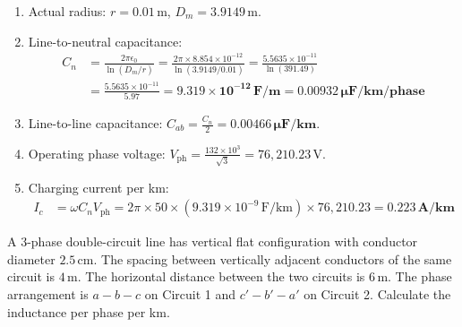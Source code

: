 \documentclass[11pt,a4paper]{article}
\newenvironment{Problem}[1][Numerical Problem]{\begin{tcolorbox}[problembox, title=#1]}{\end{tcolorbox}}
\newenvironment{Solution}[1][Step-by-Step Solution]{\begin{tcolorbox}[solbox, title=#1]}{\end{tcolorbox}}
\begin{document}
\begin{Solution}
\begin{enumerate}
  \item Actual radius: $r = 0.01\,\text{m}$, $D_m = 3.9149\,\text{m}$.
  \item Line-to-neutral capacitance:
    \begin{align*}
      C_n &= \frac{2\pi \epsilon_0}{\ln(D_m / r)} = \frac{2\pi \times 8.854 \times 10^{-12}}{\ln(3.9149 / 0.01)} = \frac{5.5635 \times 10^{-11}}{\ln(391.49)} \\
          &= \frac{5.5635 \times 10^{-11}}{5.97} = \mathbf{9.319 \times 10^{-12}\,\text{F/m}} = \mathbf{0.00932\,\mu\text{F/km/phase}}
    \end{align*}
  \item Line-to-line capacitance: $C_{ab} = \frac{C_n}{2} = \mathbf{0.00466\,\mu\text{F/km}}$.
  \item Operating phase voltage: $V_{\text{ph}} = \frac{132 \times 10^3}{\sqrt{3}} = 76,210.23\,\text{V}$.
  \item Charging current per km:
    \begin{align*}
      I_c &= \omega C_n V_{\text{ph}} = 2\pi \times 50 \times (9.319 \times 10^{-9}\,\text{F/km}) \times 76,210.23 = \mathbf{0.223\,\text{A/km}}
    \end{align*}
\end{enumerate}
\end{Solution}

\begin{Problem}[Problem 3: Inductance of a Three-Phase Double-Circuit Line]
A $3$-phase double-circuit line has vertical flat configuration with conductor diameter $2.5\,\text{cm}$. The spacing between vertically adjacent conductors of the same circuit is $4\,\text{m}$. The horizontal distance between the two circuits is $6\,\text{m}$. The phase arrangement is $a-b-c$ on Circuit 1 and $c'-b'-a'$ on Circuit 2. Calculate the inductance per phase per km.
\end{Problem}
\end{document}
